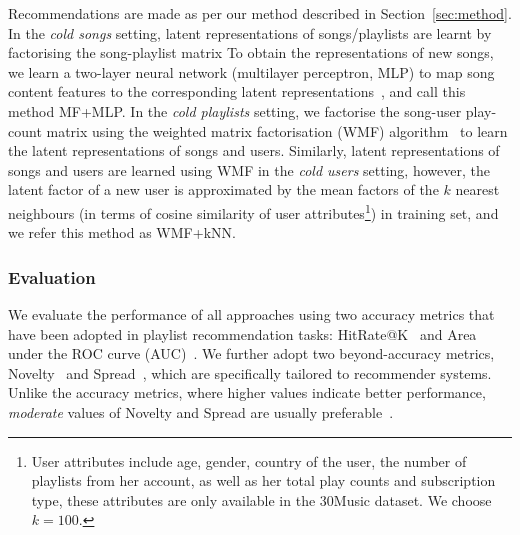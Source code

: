 \begin{itemize}
      Recommendations are made as per our method described in Section~\ref{sec:method}.
      In the \emph{cold songs} setting, latent representations of songs/playlists are learnt by factorising the song-playlist matrix  
      To obtain the representations of new songs, we learn a two-layer neural network (multilayer perceptron, MLP) to map song 
      content features to the corresponding latent representations~\cite{Gantner:2010,van2013deep}, and call this method MF+MLP. 
      In the \emph{cold playlists} setting, we factorise the song-user play-count matrix using the weighted matrix factorisation (WMF) 
      algorithm~\cite{hu2008collaborative,van2013deep} to learn the latent representations of songs and users.
      Similarly, latent representations of songs and users are learned using WMF in the \emph{cold users} setting, however, the latent 
      factor of a new user is approximated by the mean factors of the $k$ nearest neighbours (in terms of cosine similarity of user 
      attributes\footnote{User attributes include age, gender, country of the user, the number of playlists from her account, as well as 
      her total play counts and subscription type, these attributes are only available in the 30Music dataset. We choose $k=100$.}) 
      in training set, and we refer this method as WMF+kNN.
\end{itemize}




\subsubsection{Evaluation}
We evaluate the performance of all approaches using two accuracy metrics that have been adopted 
in playlist recommendation tasks:
HitRate@K~\cite{hariri2012context} and Area under the ROC curve (AUC)~\cite{manning2008introIR}.
We further adopt two beyond-accuracy metrics, \ie
Novelty~\cite{zhang2012auralist,schedl2017} and Spread~\cite{kluver2014evaluating},
which are specifically tailored to recommender systems.
Unlike the accuracy metrics, where higher values indicate better performance,
\emph{moderate} values of Novelty and Spread are usually preferable~\cite{kluver2014evaluating,schedl2017}.
%

